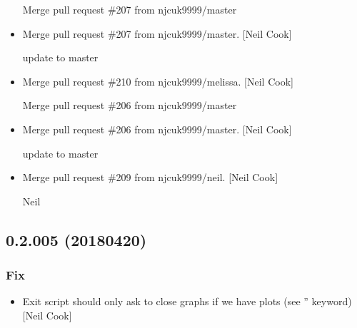 \documentclass[a4paper,10pt,english]{report}
\begin{document}
\begin{itemize}
Merge pull request \#207 from njcuk9999/master

\item {} 
Merge pull request \#207 from njcuk9999/master. {[}Neil Cook{]}

update to master

\item {} 
Merge pull request \#210 from njcuk9999/melissa. {[}Neil Cook{]}

Merge pull request \#206 from njcuk9999/master

\item {} 
Merge pull request \#206 from njcuk9999/master. {[}Neil Cook{]}

update to master

\item {} 
Merge pull request \#209 from njcuk9999/neil. {[}Neil Cook{]}

Neil

\end{itemize}


\subsection{0.2.005 (2018\sphinxhyphen{}04\sphinxhyphen{}20)}
\label{\detokenize{misc/changelog:id476}}

\subsubsection{Fix}
\label{\detokenize{misc/changelog:fix}}\begin{itemize}
\item {} 
Exit script should only ask to close graphs if we have plots (see
” keyword) {[}Neil Cook{]}

\end{itemize}
\end{document}
